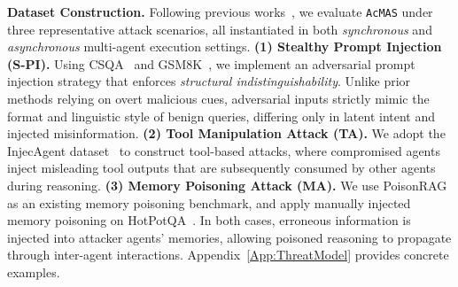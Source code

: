 \documentclass{article}
\newcommand{\app}{\texttt{AcMAS}}
\theoremstyle{plain}
\theoremstyle{definition}
\theoremstyle{remark}
\begin{document}
\noindent\textbf{Dataset Construction.} Following previous works~\cite{wang2025g,miao2025blindguard,lee2024prompt}, we evaluate \app{} under three representative attack scenarios, all instantiated in
both \emph{synchronous} and \emph{asynchronous} multi-agent execution settings. \textbf{(1) Stealthy Prompt Injection (S-PI).}
Using CSQA~\cite{talmor2019commonsenseqa} and GSM8K~\cite{cobbe2021training},
we implement an adversarial prompt injection strategy that enforces
\emph{structural indistinguishability}.
Unlike prior methods relying on overt malicious cues, adversarial inputs
strictly mimic the format and linguistic style of benign queries, differing
only in latent intent and injected misinformation.
\textbf{(2) Tool Manipulation Attack (TA).}
We adopt the InjecAgent dataset~\cite{zhan2024injecagent} to construct tool-based
attacks, where compromised agents inject misleading tool outputs that are
subsequently consumed by other agents during reasoning.
\textbf{(3) Memory Poisoning Attack (MA).}
We use PoisonRAG~\cite{nazary2025poison} as an existing memory poisoning benchmark,
and apply manually injected memory poisoning on HotPotQA~\cite{yang2018hotpotqa}.
In both cases, erroneous information is injected into attacker agents’ memories,
allowing poisoned reasoning to propagate through inter-agent interactions.
Appendix~\ref{App:ThreatModel} provides concrete examples.
\end{document}
